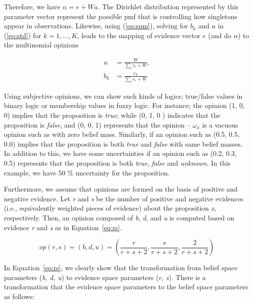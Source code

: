 \documentclass[a4,12pt]{ozu-thesis}
\begin{document}
Therefore, we have $\alpha = e + Wa$. The Dirichlet distribution represented by this parameter vector represent the possible pmf that is controlling how singletons appear in observations. Likewise, using (\ref{eq:sum}), solving for $b_{k}$ and $u$ in (\ref{eq:std}) for $k=1,\ldots,K$, leads to the mapping of evidence vector $e$ (and do $\alpha$) to the multinomial opinions


\begin{subequations}
\label{eq:optim}
\begin{align}
    u &= \frac{W}{\sum_{i}e_{i}+W},   \label{eq:cost}\\
    b_{k}  &= \frac{e_{k}}{\sum_{i}e_{i}+W} \label{eq:const1}
\end{align}
\end{subequations}


Using subjective opinions, we can show such kinds of logics; true/false values in binary logic or membership values in fuzzy logic. For instance; the opinion (1, 0, 0) implies that the proposition is \textit{true}; while (0, 1, 0 ) indicates that the proposition is \textit{false}, and (0, 0, 1) represents that the opinion -- $\omega _{x} $  is a vacuous opinion such as with zero belief mass.  Similarly, if an opinion such as (0.5, 0.5, 0.0) implies that the proposition is both \textit{true} and \textit{false} with same belief masses. In addition to this, we have some uncertainties if an opinion such as (0.2, 0.3, 0.5) represents that the proposition is both \textit{true}, \textit{false} and \textit{unknown}. In this example, we have 50 \% uncertainty for the proposition.


Furthermore, we assume that opinions are formed on the basis of positive and negative evidence. Let \textit{r} and \textit{s} be the number of positive and negative evidences (i.e., equivalently weighted pieces of evidence) about the proposition \textit{x}, respectively. Then, an opinion composed of \textit{b}, \textit{d}, and \textit{u} is computed based on evidence \textit{r} and \textit{s} as in Equation~\ref{eq:rs}.


\begin{equation}
\label{eq:rs}
op(r, s) = (b, d, u) = \left ( \frac{r}{r+s+2}, \frac{s}{r+s+2}, \frac{2}{r+s+2} \right )
\end{equation}


In Equation~\ref{eq:rs}, we clearly show that the transformation from belief space parameters (\textit{b, d, u}) to evidence space parameters (\textit{r, s}). There is a transformation that the evidence space parameters to the belief space parameters as follows:
\end{document}
